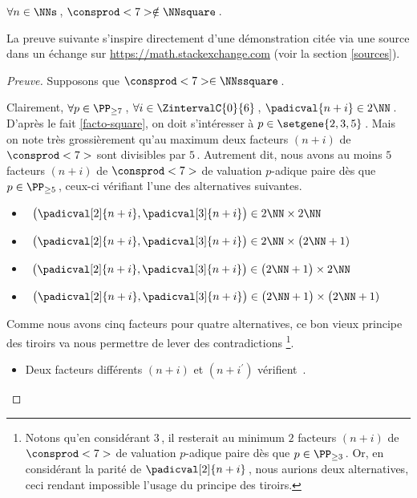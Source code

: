 \begin{fact} \label{case-7}
	 $\forall n \in \NNs$\,, $\consprod<7> \notin \NNsquare$\,.
\end{fact}




La preuve suivante s'inspire directement d'une démonstration citée via une source dans un échange sur \url{https://math.stackexchange.com} (voir la section \ref{sources}).


\begin{proof}[Preuve]%
    Supposons que $\consprod<7> \in \NNssquare$\,.
    
    \smallskip
    
    Clairement, 
    $\forall p \in \PP_{\geq 7}$\,, 
    $\forall i \in \ZintervalC{0}{6}$\,, 
    $\padicval{n + i} \in 2 \NN$\,.
    D'après le fait \ref{facto-square}, on doit s'intéresser à $p \in \setgene{2, 3, 5}$\,. 
    Mais on note très grossièrement qu'au maximum deux facteurs $(n + i)$ de $\consprod<7>$ sont divisibles par $5$\,.
    Autrement dit, nous avons au moins $5$ facteurs $(n + i)$ de $\consprod<7>$ de valuation $p$-adique paire dès que $p \in \PP_{\geq 5}$\,, ceux-ci vérifiant l'une des alternatives suivantes.
    \begin{itemize}
    	\smallskip
		\item {}\,
		$\big( \padicval[2]{n + i} , \padicval[3]{n + i} \big) \in 2 \NN \times 2 \NN$

    	\smallskip
		\item {}\,
		$\big( \padicval[2]{n + i} , \padicval[3]{n + i} \big) \in 2 \NN \times \big( 2 \NN + 1)$

    	\smallskip
		\item {}\,
		$\big( \padicval[2]{n + i} , \padicval[3]{n + i} \big) \in \big( 2 \NN + 1 \big) \times 2 \NN$

    	\smallskip
		\item {}\,
		$\big( \padicval[2]{n + i} , \padicval[3]{n + i} \big) \in \big( 2 \NN + 1 \big) \times \big( 2 \NN + 1)$
    \end{itemize}
    
    \medskip
    
    Comme nous avons cinq facteurs pour quatre alternatives, ce bon vieux principe des tiroirs va nous permettre de lever des contradictions
    \footnote{
    	Notons qu'en considérant $3$\,, il resterait au minimum $2$ facteurs $(n + i)$ de $\consprod<7>$ de valuation $p$-adique paire dès que $p \in \PP_{\geq 3}$\,. Or, en considérant la parité de $\padicval[2]{n + i}$\,, nous aurions deux alternatives, ceci rendant impossible l'usage du principe des tiroirs.
    }.
    \begin{itemize}
    	\medskip
		\item Deux facteurs différents $(n+i)$ et $(n+i^\prime)$ vérifient \,.
		

\end{itemize}
\end{proof}
